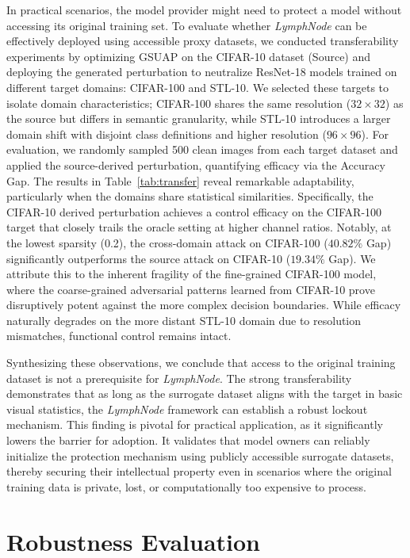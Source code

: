 \documentclass[conference]{IEEEtran}
\begin{document}
In practical scenarios, the model provider might need to protect a model without accessing its original training set. To evaluate whether \textit{LymphNode} can be effectively deployed using accessible proxy datasets, we conducted transferability experiments by optimizing GSUAP on the CIFAR-10 dataset (Source) and deploying the generated perturbation to neutralize ResNet-18 models trained on different target domains: CIFAR-100 and STL-10. We selected these targets to isolate domain characteristics; CIFAR-100 shares the same resolution ($32\times32$) as the source but differs in semantic granularity, while STL-10 introduces a larger domain shift with disjoint class definitions and higher resolution ($96\times96$). For evaluation, we randomly sampled 500 clean images from each target dataset and applied the source-derived perturbation, quantifying efficacy via the Accuracy Gap. The results in Table~\ref{tab:transfer} reveal remarkable adaptability, particularly when the domains share statistical similarities. Specifically, the CIFAR-10 derived perturbation achieves a control efficacy on the CIFAR-100 target that closely trails the oracle setting at higher channel ratios. Notably, at the lowest sparsity (0.2), the cross-domain attack on CIFAR-100 ($40.82\%$ Gap) significantly outperforms the source attack on CIFAR-10 ($19.34\%$ Gap). We attribute this to the inherent fragility of the fine-grained CIFAR-100 model, where the coarse-grained adversarial patterns learned from CIFAR-10 prove disruptively potent against the more complex decision boundaries. While efficacy naturally degrades on the more distant STL-10 domain due to resolution mismatches, functional control remains intact.

Synthesizing these observations, we conclude that access to the original training dataset is not a prerequisite for \textit{LymphNode}. The strong transferability demonstrates that as long as the surrogate dataset aligns with the target in basic visual statistics, the \textit{LymphNode} framework can establish a robust lockout mechanism. This finding is pivotal for practical application, as it significantly lowers the barrier for adoption. It validates that model owners can reliably initialize the protection mechanism using publicly accessible surrogate datasets, thereby securing their intellectual property even in scenarios where the original training data is private, lost, or computationally too expensive to process.

\section{Robustness Evaluation}
\label{sec:robustness}
\end{document}

